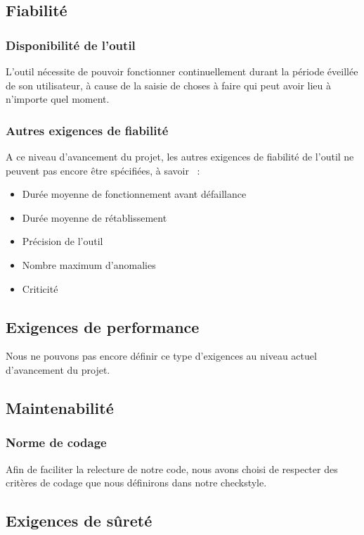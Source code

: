 	\subsection{Fiabilité}

	\subsubsection{Disponibilité de l'outil}
L'outil nécessite de pouvoir fonctionner continuellement durant la période éveillée de son utilisateur, à cause de la saisie de choses à faire qui peut avoir lieu à n'importe quel moment.

	\subsubsection{Autres exigences de fiabilité}
A ce niveau d'avancement du projet, les autres exigences de fiabilité de l'outil ne peuvent pas encore être spécifiées, à savoir ~:
\begin{itemize}
 \item Durée moyenne de fonctionnement avant défaillance
 \item Durée moyenne de rétablissement
 \item Précision de l'outil
 \item Nombre maximum d'anomalies
 \item Criticité
\end{itemize}

	\subsection{Exigences de performance}
Nous ne pouvons pas encore définir ce type d'exigences au niveau actuel d'avancement du projet.


	\subsection{Maintenabilité}

	\subsubsection{Norme de codage}
Afin de faciliter la relecture de notre code, nous avons choisi de respecter des critères de codage que nous définirons dans notre checkstyle.


	\subsection{Exigences de sûreté}

